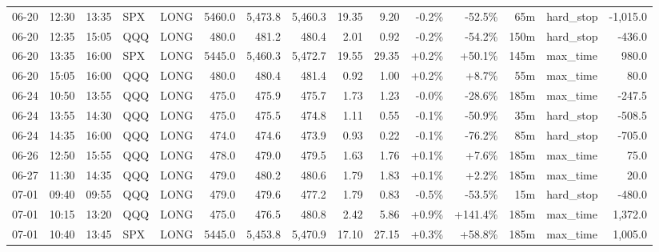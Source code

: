 \documentclass[11pt,a4paper,twoside]{article}
\begin{document}
\begin{landscape}
\begin{center}
\begin{longtable}{>{\color{txtmain}}l l l l l r r r r r r r r >{\color{txtmain}}l r}
06-20 & 12:30 & 13:35 & SPX & LONG & 5460.0 & 5,473.8 & 5,460.3 & 19.35 & 9.20 & \textcolor{lossred}{-0.2\%} & \textcolor{lossred}{-52.5\%} & 65m & hard\_stop & \textcolor{lossred}{-1,015.0} \\
06-20 & 12:35 & 15:05 & QQQ & LONG & 480.0 & 481.2 & 480.4 & 2.01 & 0.92 & \textcolor{lossred}{-0.2\%} & \textcolor{lossred}{-54.2\%} & 150m & hard\_stop & \textcolor{lossred}{-436.0} \\
06-20 & 13:35 & 16:00 & SPX & LONG & 5445.0 & 5,460.3 & 5,472.7 & 19.55 & 29.35 & \textcolor{wingreen}{+0.2\%} & \textcolor{wingreen}{+50.1\%} & 145m & max\_time & \textcolor{wingreen}{980.0} \\
06-20 & 15:05 & 16:00 & QQQ & LONG & 480.0 & 480.4 & 481.4 & 0.92 & 1.00 & \textcolor{wingreen}{+0.2\%} & \textcolor{wingreen}{+8.7\%} & 55m & max\_time & \textcolor{wingreen}{80.0} \\
06-24 & 10:50 & 13:55 & QQQ & LONG & 475.0 & 475.9 & 475.7 & 1.73 & 1.23 & \textcolor{lossred}{-0.0\%} & \textcolor{lossred}{-28.6\%} & 185m & max\_time & \textcolor{lossred}{-247.5} \\
06-24 & 13:55 & 14:30 & QQQ & LONG & 475.0 & 475.5 & 474.8 & 1.11 & 0.55 & \textcolor{lossred}{-0.1\%} & \textcolor{lossred}{-50.9\%} & 35m & hard\_stop & \textcolor{lossred}{-508.5} \\
06-24 & 14:35 & 16:00 & QQQ & LONG & 474.0 & 474.6 & 473.9 & 0.93 & 0.22 & \textcolor{lossred}{-0.1\%} & \textcolor{lossred}{-76.2\%} & 85m & hard\_stop & \textcolor{lossred}{-705.0} \\
06-26 & 12:50 & 15:55 & QQQ & LONG & 478.0 & 479.0 & 479.5 & 1.63 & 1.76 & \textcolor{wingreen}{+0.1\%} & \textcolor{wingreen}{+7.6\%} & 185m & max\_time & \textcolor{wingreen}{75.0} \\
06-27 & 11:30 & 14:35 & QQQ & LONG & 479.0 & 480.2 & 480.6 & 1.79 & 1.83 & \textcolor{wingreen}{+0.1\%} & \textcolor{wingreen}{+2.2\%} & 185m & max\_time & \textcolor{wingreen}{20.0} \\
07-01 & 09:40 & 09:55 & QQQ & LONG & 479.0 & 479.6 & 477.2 & 1.79 & 0.83 & \textcolor{lossred}{-0.5\%} & \textcolor{lossred}{-53.5\%} & 15m & hard\_stop & \textcolor{lossred}{-480.0} \\
07-01 & 10:15 & 13:20 & QQQ & LONG & 475.0 & 476.5 & 480.8 & 2.42 & 5.86 & \textcolor{wingreen}{+0.9\%} & \textcolor{wingreen}{+141.4\%} & 185m & max\_time & \textcolor{wingreen}{1,372.0} \\
07-01 & 10:40 & 13:45 & SPX & LONG & 5445.0 & 5,453.8 & 5,470.9 & 17.10 & 27.15 & \textcolor{wingreen}{+0.3\%} & \textcolor{wingreen}{+58.8\%} & 185m & max\_time & \textcolor{wingreen}{1,005.0} \\

\end{longtable}
\end{center}
\end{landscape}
\end{document}
